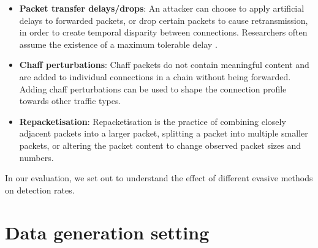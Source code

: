 \documentclass[runningheads,11pt]{llncs}\usepackage[]{graphicx}\usepackage[]{color}
\begin{document}
\begin{itemize}

\item \textbf{Packet transfer delays/drops}: An attacker can choose to apply artificial delays to forwarded packets, or drop certain packets to cause retransmission, in order to create temporal disparity between connections. Researchers often assume the existence of a maximum tolerable delay \cite{donoho2002multiscale}.


\item \textbf{Chaff perturbations}: Chaff packets do not contain meaningful content and are added to individual connections in a chain without being forwarded. Adding chaff perturbations can be used to shape the connection profile towards other traffic types. 

\item \textbf{Repacketisation}: Repacketisation is the practice of combining closely adjacent packets into a larger packet, splitting a packet into multiple smaller packets, or altering the packet content to change observed packet sizes and numbers.


\end{itemize}

In our evaluation, we set out to understand the effect of different evasive methods on detection rates. 

\section{Data generation setting}\label{Sec:Datasetcreation}

\end{document}
